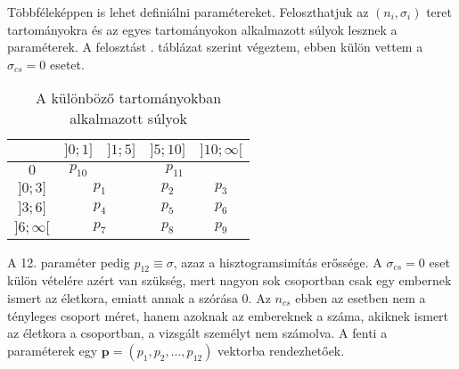 \documentclass[12pt]{article}
\begin{document}
Többféleképpen is lehet definiálni paramétereket. Feloszthatjuk az $(n_i, \sigma_i)$ teret \iffalse TODO: vagy mit \fi tartományokra és az egyes tartományokon alkalmazott súlyok lesznek a paraméterek. A felosztást . táblázat szerint végeztem, ebben külön vettem a $\sigma_{cs} = 0$ esetet. %
\begin{table}[H]
	\centering
	\begin{tabular}{|c|c|c|c|c|} %
		\hline
		\diagbox{$\sigma_{cs}$}{$n_{cs}$} & $]0;1]$ & $]1;5]$ & $]5;10]$ & $]10;\infty[$  \\
		\hline
		$0$ & $p_{10}$ & \multicolumn{3}{|c|}{$p_{11}$} \\
		\hline
		$]0;3]$ & \multicolumn{2}{|c|}{$p_1$} & $p_2$ & $p_3$ \\
		\hline
		$]3;6]$ & \multicolumn{2}{|c|}{$p_4$} & $p_5$ & $p_6$ \\
		\hline
		$]6;\infty[$  & \multicolumn{2}{|c|}{$p_7$} & $p_8$ & $p_9$ \\
		\hline
	\end{tabular}
	\caption{A különböző tartományokban alkalmazott súlyok}
	\label{felosztas}
\end{table}
\noindent
A 12. paraméter pedig $p_{12} \equiv \sigma$, azaz a hisztogramsimítás erőssége. A $\sigma_{cs} = 0$ eset külön vételére azért van szükség, mert nagyon sok csoportban csak egy embernek ismert az életkora, emiatt annak a szórása $0$. Az $n_{cs}$ ebben az esetben nem a tényleges csoport méret, hanem azoknak az embereknek a száma, akiknek ismert az életkora a csoportban, a vizsgált személyt nem számolva.
A fenti a paraméterek egy $\mathbf{p} = (p_1, p_2, ..., p_{12})$ vektorba rendezhetőek.
\end{document}
